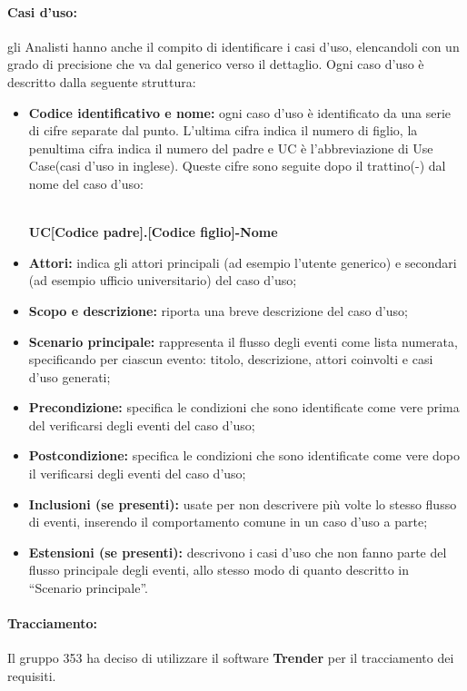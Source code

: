 \documentclass[NormeDiProgetto.tex]{subfiles}
\begin{document}
\paragraph{Casi d'uso:} gli Analisti hanno anche il compito di identificare i casi d’uso, elencandoli con un grado di precisione che va dal generico verso il dettaglio. Ogni caso d’uso è descritto dalla seguente struttura:\\
\begin{itemize}
	\item \textbf{Codice identificativo e nome:} ogni caso d'uso è identificato da una serie di cifre separate dal punto. L'ultima cifra indica il numero di figlio, la penultima cifra indica il numero del padre e UC è l'abbreviazione di Use Case(casi d'uso in inglese). Queste cifre sono seguite dopo il trattino(-) dal nome del caso d'uso: \\\\
	\centerline{\textbf{UC[Codice padre].[Codice figlio]-Nome}}
	\item \textbf{Attori:} indica gli attori principali (ad esempio l’utente generico) e
	secondari (ad esempio ufficio universitario) del caso d’uso;
	\item \textbf{Scopo e descrizione:} riporta una breve descrizione del caso d’uso;
	\item \textbf{Scenario principale:} rappresenta il flusso degli eventi come lista
	numerata, specificando per ciascun evento: titolo, descrizione, attori
	coinvolti e casi d’uso generati;
	\item \textbf{Precondizione:} specifica le condizioni che sono identificate come vere
	prima del verificarsi degli eventi del caso d’uso;
	\item \textbf{Postcondizione:} specifica le condizioni che sono identificate come
	vere dopo il verificarsi degli eventi del caso d’uso;
	\item \textbf{Inclusioni (se presenti):} usate per non descrivere più volte lo stesso flusso di eventi,
	inserendo il comportamento comune in un caso d’uso a parte;
	\item \textbf{Estensioni (se presenti):} descrivono i casi d’uso che non fanno parte del flusso
	principale degli eventi, allo stesso modo di quanto descritto in “Scenario
	principale”.
\end{itemize}
\paragraph{Tracciamento:}Il gruppo 353 ha deciso di utilizzare il software \textbf{Trender} per il tracciamento dei requisiti. 
\end{document}
